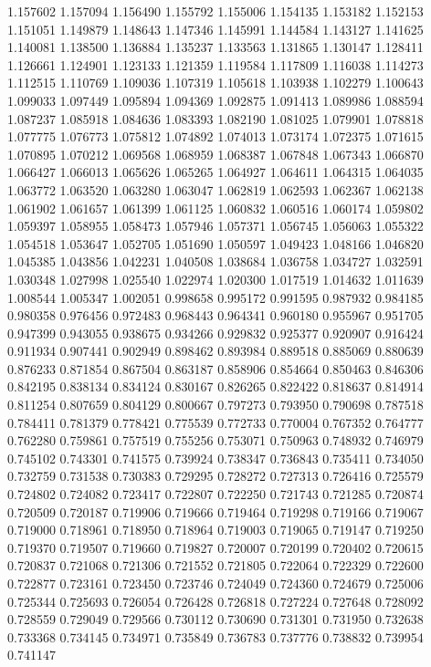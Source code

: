 1.157602
1.157094
1.156490
1.155792
1.155006
1.154135
1.153182
1.152153
1.151051
1.149879
1.148643
1.147346
1.145991
1.144584
1.143127
1.141625
1.140081
1.138500
1.136884
1.135237
1.133563
1.131865
1.130147
1.128411
1.126661
1.124901
1.123133
1.121359
1.119584
1.117809
1.116038
1.114273
1.112515
1.110769
1.109036
1.107319
1.105618
1.103938
1.102279
1.100643
1.099033
1.097449
1.095894
1.094369
1.092875
1.091413
1.089986
1.088594
1.087237
1.085918
1.084636
1.083393
1.082190
1.081025
1.079901
1.078818
1.077775
1.076773
1.075812
1.074892
1.074013
1.073174
1.072375
1.071615
1.070895
1.070212
1.069568
1.068959
1.068387
1.067848
1.067343
1.066870
1.066427
1.066013
1.065626
1.065265
1.064927
1.064611
1.064315
1.064035
1.063772
1.063520
1.063280
1.063047
1.062819
1.062593
1.062367
1.062138
1.061902
1.061657
1.061399
1.061125
1.060832
1.060516
1.060174
1.059802
1.059397
1.058955
1.058473
1.057946
1.057371
1.056745
1.056063
1.055322
1.054518
1.053647
1.052705
1.051690
1.050597
1.049423
1.048166
1.046820
1.045385
1.043856
1.042231
1.040508
1.038684
1.036758
1.034727
1.032591
1.030348
1.027998
1.025540
1.022974
1.020300
1.017519
1.014632
1.011639
1.008544
1.005347
1.002051
0.998658
0.995172
0.991595
0.987932
0.984185
0.980358
0.976456
0.972483
0.968443
0.964341
0.960180
0.955967
0.951705
0.947399
0.943055
0.938675
0.934266
0.929832
0.925377
0.920907
0.916424
0.911934
0.907441
0.902949
0.898462
0.893984
0.889518
0.885069
0.880639
0.876233
0.871854
0.867504
0.863187
0.858906
0.854664
0.850463
0.846306
0.842195
0.838134
0.834124
0.830167
0.826265
0.822422
0.818637
0.814914
0.811254
0.807659
0.804129
0.800667
0.797273
0.793950
0.790698
0.787518
0.784411
0.781379
0.778421
0.775539
0.772733
0.770004
0.767352
0.764777
0.762280
0.759861
0.757519
0.755256
0.753071
0.750963
0.748932
0.746979
0.745102
0.743301
0.741575
0.739924
0.738347
0.736843
0.735411
0.734050
0.732759
0.731538
0.730383
0.729295
0.728272
0.727313
0.726416
0.725579
0.724802
0.724082
0.723417
0.722807
0.722250
0.721743
0.721285
0.720874
0.720509
0.720187
0.719906
0.719666
0.719464
0.719298
0.719166
0.719067
0.719000
0.718961
0.718950
0.718964
0.719003
0.719065
0.719147
0.719250
0.719370
0.719507
0.719660
0.719827
0.720007
0.720199
0.720402
0.720615
0.720837
0.721068
0.721306
0.721552
0.721805
0.722064
0.722329
0.722600
0.722877
0.723161
0.723450
0.723746
0.724049
0.724360
0.724679
0.725006
0.725344
0.725693
0.726054
0.726428
0.726818
0.727224
0.727648
0.728092
0.728559
0.729049
0.729566
0.730112
0.730690
0.731301
0.731950
0.732638
0.733368
0.734145
0.734971
0.735849
0.736783
0.737776
0.738832
0.739954
0.741147
